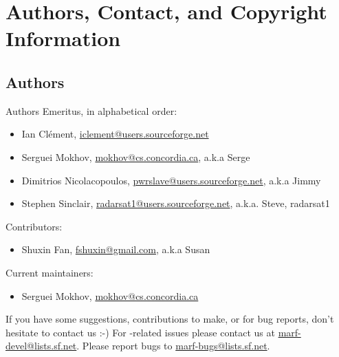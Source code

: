 

\section{Authors, Contact, and Copyright Information}



\subsection{Authors}

\noindent
Authors Emeritus, in alphabetical order:

\begin{itemize}
	\item Ian Cl\'ement, \url{iclement@users.sourceforge.net}
	\item Serguei Mokhov, \url{mokhov@cs.concordia.ca}, a.k.a Serge
	\item Dimitrios Nicolacopoulos, \url{pwrslave@users.sourceforge.net}, a.k.a Jimmy
	\item Stephen Sinclair, \url{radarsat1@users.sourceforge.net}, a.k.a. Steve, radarsat1
\end{itemize}

\noindent
Contributors:

\begin{itemize}
	\item Shuxin Fan, \url{fshuxin@gmail.com}, a.k.a Susan
\end{itemize}

\noindent
Current maintainers:

\begin{itemize}
	\item Serguei Mokhov, \url{mokhov@cs.concordia.ca}
\end{itemize}

\noindent
If you have
some suggestions, contributions to make, or for bug reports, don't
hesitate to contact us :-)
For {\marf}-related issues please contact us at \url{marf-devel@lists.sf.net}.
Please report bugs to \url{marf-bugs@lists.sf.net}.

%
%
%



%
%
%



%
%
%

